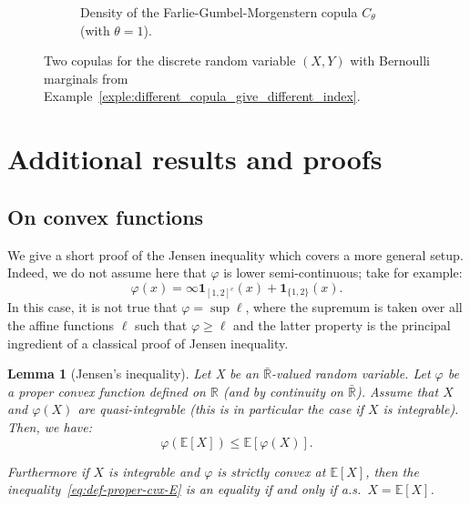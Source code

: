 \documentclass[12pt]{article}
\newcommand{\E}{{\mathbb E}}
\newcommand{\R}{{\mathbb R}}
\newcommand{\ind}{\mathbf{1}}
\theoremstyle{plain}
\newtheorem{lem}[theo]{Lemma}
\theoremstyle{remark}
\begin{document}
\begin{figure}[htbp]
\begin{subfigure}[t]{0.49\textwidth}
        \caption{Density of the Farlie-Gumbel-Morgenstern copula $C_\theta$ (with $\theta = 1$).}
        \label{fig:density_FGM_copula}
    \end{subfigure}
    \caption{Two copulas for the discrete random variable $(X,Y)$ with Bernoulli marginals from Example~\ref{exple:different_copula_give_different_index}.}
    \label{fig:density_interpolating_and_FGM_copula}
\end{figure} 

\clearpage





\clearpage

\section{Additional results and proofs}
\label{sec:proof_introduction}

\subsection{On convex functions}

We give a short proof of the Jensen inequality which covers a more general setup.
Indeed, we do not assume here that $\varphi$ is lower
    semi-continuous; take for example:
    $$
    \varphi(x)=\infty  \ind_{[1, 2]^c}(x) +
    \ind_{\{1,2\}}(x).
    $$
    In this case, it is not true that $\varphi=\sup \ell$, where
    the supremum is taken over all the affine functions $\ell$ such that
    $\varphi\geq  \ell$ and the latter property  is the principal ingredient of a
    classical proof of Jensen inequality.

\begin{lem}[Jensen's inequality]
\label{lem:equality_jensen}
Let X be an $\bar \R$-valued  random variable. Let $\varphi$ be a proper
convex function defined on $\R$ (and by continuity on $\bar \R$). Assume
that $X$  and $\varphi(X)$ are  quasi-integrable (this is  in particular
the case if $X$ is integrable). Then, we have:
\begin{equation}
  \label{eq:def-proper-cvx-E}
 \varphi(\E[X]) \leq \E[\varphi(X)].
\end{equation}


Furthermore if $X$ is integrable and $\varphi$ is strictly convex at
$\E[X]$, then the inequality~\eqref{eq:def-proper-cvx-E} is an equality
if and only if a.s.\ $X =\E[X]$.
\end{lem}
\end{document}
